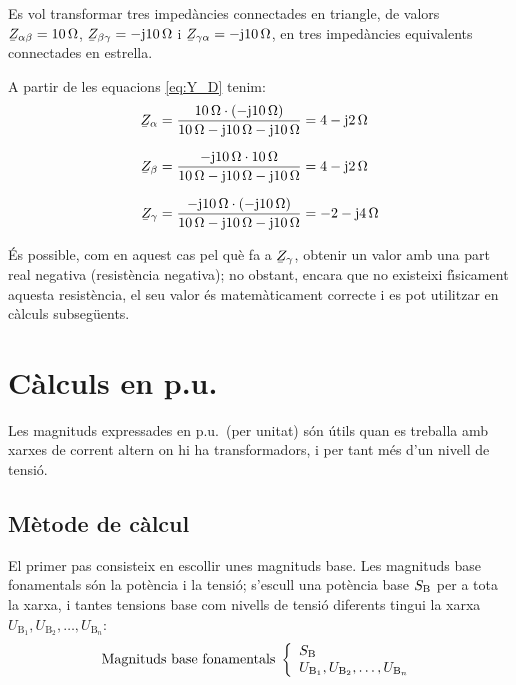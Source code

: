 \begin{exemple}
Es vol transformar tres imped\`{a}ncies connectades en triangle, de
valors $ \cmplx{Z}_{\alpha\beta}=10\unit{\ohm}$,
$\cmplx{Z}_{\beta\gamma}=-\ju10\unit{\ohm}$ i
$\cmplx{Z}_{\gamma\alpha}=-\ju10\unit{\ohm}$, en tres imped\`{a}ncies
equivalents connectades en estrella.

A partir de les equacions \eqref{eq:Y_D}  tenim:
\begin{align*}
   \cmplx{Z}_{\alpha} & = \frac{10\unit{\ohm}\cdot(-\ju10\unit{\ohm})}{10\unit{\ohm} - \ju10\unit{\ohm} - \ju10\unit{\ohm}} = 4 - \ju 2\unit{\ohm} \\[1.5ex]
   \cmplx{Z}_{\beta} & = \frac{-\ju10\unit{\ohm}\cdot10\unit{\ohm}}{10\unit{\ohm} - \ju10\unit{\ohm} - \ju10\unit{\ohm}} = 4 - \ju 2\unit{\ohm} \\[1.5ex]
\cmplx{Z}_{\gamma} &=
\frac{-\ju10\unit{\ohm}\cdot(-\ju10\unit{\ohm})}{10\unit{\ohm} -
\ju10\unit{\ohm} - \ju10\unit{\ohm}} = -2 - \ju 4\unit{\ohm}
\end{align*}

\'{E}s possible, com en aquest cas pel qu\`{e} fa a $\cmplx{Z}_{\gamma}$,
obtenir un valor amb una part real negativa (resist\`{e}ncia negativa);
no obstant, encara que no existeixi f\'{\i}sicament aquesta resist\`{e}ncia,
el seu valor \'{e}s matem\`{a}ticament correcte i es pot utilitzar en
c\`{a}lculs subseg\"{u}ents.
\end{exemple}


\section{C\`{a}lculs en p.u.} \label{sec:seccio_pu} 

Les magnituds expressades en p.u.\ (per unitat) s\'{o}n \'{u}tils quan es treballa
amb xarxes de corrent altern on hi ha transformadors, i per tant m\'{e}s d'un nivell de tensi\'{o}.

\subsection{M\`{e}tode de c\`{a}lcul} 

 El primer pas consisteix en escollir unes magnituds
base. Les magnituds base fonamentals s\'{o}n la pot\`{e}ncia i la tensi\'{o}; s'escull una pot\`{e}ncia
base $S_\mathrm{B}$ per a tota la xarxa, i tantes tensions base com nivells de tensi\'{o} diferents
tingui la xarxa $U_{\text{B}_1}, U_{\text{B}_2}, \ldots, U_{\text{B}_n}$:
\begin{equation}
   \text{Magnituds base fonamentals}\;\left\{
\begin{array}{l}
   S_\mathrm{B} \\
   U_{\text{B}_1}, U_{\text{B}_2}, \ldots, U_{\text{B}_n}
\end{array}
\right.
\end{equation}

